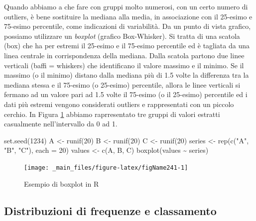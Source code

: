 \documentclass[a4paper,12pt,oneside]{book}
\newenvironment{Shaded}{\begin{snugshade}}{\end{snugshade}}
\newcommand{\DecValTok}[1]{#1}
\newcommand{\SpecialCharTok}[1]{#1}
\newcommand{\StringTok}[1]{#1}
\newcommand{\OtherTok}[1]{#1}
\newcommand{\FunctionTok}[1]{#1}
\newcommand{\AttributeTok}[1]{#1}
\newcommand{\NormalTok}[1]{#1}
\begin{document}
Quando abbiamo a che fare con gruppi molto numerosi, con un certo numero di outliers, è bene sostituire la mediana alla media, in associazione con il 25-esimo e 75-esimo percentile, come indicazioni di variabilità. Da un punto di vista grafico, possiamo utilizzare un \emph{boxplot} (grafico Box-Whisker). Si tratta di una scatola (box) che ha per estremi il 25-esimo e il 75-esimo percentile ed è tagliata da una linea centrale in corrispondenza della mediana. Dalla scatola partono due linee verticali (baffi = whiskers) che identificano il valore massimo e il minimo. Se il massimo (o il minimo) distano dalla mediana più di 1.5 volte la differenza tra la mediana stessa e il 75-esimo (o 25-esimo) percentile, allora le linee verticali si fermano ad un valore pari ad 1.5 volte il 75-esimo (o il 25-esimo) percentile ed i dati più estremi vengono considerati outliers e rappresentati con un piccolo cerchio. In Figura \ref{fig:figName241} abbiamo raprresentato tre gruppi di valori estratti casualmente nell'intervallo da 0 ad 1.

\begin{Shaded}
\begin{Highlighting}[]
\FunctionTok{set.seed}\NormalTok{(}\DecValTok{1234}\NormalTok{)}
\NormalTok{A }\OtherTok{\textless{}{-}} \FunctionTok{runif}\NormalTok{(}\DecValTok{20}\NormalTok{)}
\NormalTok{B }\OtherTok{\textless{}{-}} \FunctionTok{runif}\NormalTok{(}\DecValTok{20}\NormalTok{)}
\NormalTok{C }\OtherTok{\textless{}{-}} \FunctionTok{runif}\NormalTok{(}\DecValTok{20}\NormalTok{)}
\NormalTok{series }\OtherTok{\textless{}{-}} \FunctionTok{rep}\NormalTok{(}\FunctionTok{c}\NormalTok{(}\StringTok{"A"}\NormalTok{, }\StringTok{"B"}\NormalTok{, }\StringTok{"C"}\NormalTok{), }\AttributeTok{each =} \DecValTok{20}\NormalTok{)}
\NormalTok{values }\OtherTok{\textless{}{-}} \FunctionTok{c}\NormalTok{(A, B, C)}
\FunctionTok{boxplot}\NormalTok{(values }\SpecialCharTok{\textasciitilde{}}\NormalTok{ series)}
\end{Highlighting}
\end{Shaded}

\begin{figure}

{\centering \texttt{[image: \_main\_files/figure-latex/figName241-1]} 

}

\caption{Esempio di boxplot in R}\label{fig:figName241}
\end{figure}

\hypertarget{distribuzioni-di-frequenze-e-classamento-1}{%
\subsection{Distribuzioni di frequenze e classamento}\label{distribuzioni-di-frequenze-e-classamento-1}}
\end{document}

